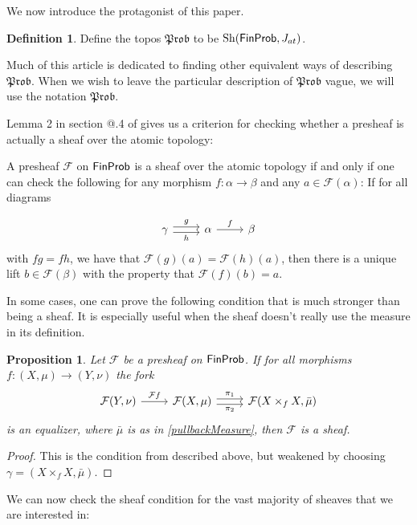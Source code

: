 \documentclass[a4paper]{amsproc}
\makeatletter
\theoremstyle{plain}
\newtheorem{proposition}[theorem]{Proposition}
\theoremstyle{definition}
\newtheorem{definition}[theorem]{Definition}
\theoremstyle{remark}
\numberwithin{equation}{section}
\DeclareMathOperator{\Sh}{Sh}
\newcommand{\FinProb}{\textup{\textsf{FinProb}}}
\newcommand{\Prob}{\mathfrak{Prob}}
\newcommand{\Rmnum}[1]{\expandafter\@slowromancap\romannumeral #1@}
\makeatother
\begin{document}
We now introduce the protagonist of this paper.

\begin{definition}
    Define the topos $\Prob$ to be $\Sh(\FinProb, J_{at})$.
\end{definition}

Much of this article is dedicated to finding other equivalent ways of describing $\Prob$. When we wish to leave the particular description of $\Prob$ vague, we will use the notation $\Prob$.

Lemma 2 in section \Rmnum{3}.4 of \cite{maclane2012sheaves} gives us a criterion for checking whether a presheaf is actually a sheaf over the atomic topology:

A presheaf $\mathcal{F}$ on $\FinProb$ is a sheaf over the atomic topology if and only if one can check the following for any morphism $f: \alpha \to \beta$ and any $a \in \mathcal{F}(\alpha)$: If for all diagrams

\[
\begin{tikzcd}
\gamma \arrow[r, "g", shift left] \arrow[r, "h"', shift right] & \alpha \arrow[r, "f"] & \beta
\end{tikzcd}
\]
with $f g = f h$, we have that $\mathcal{F}(g)(a) = \mathcal{F}(h)(a)$, then there is a unique lift $b \in \mathcal{F}(\beta)$ with the property that $\mathcal{F}(f)(b) = a$.

In some cases, one can prove the following condition that is much stronger than being a sheaf. It is especially useful when the sheaf doesn't really use the measure in its definition.

\begin{proposition} \label{sheafConditionWeak}
Let $\mathcal{F}$ be a presheaf on $\FinProb$. If for all morphisms $f: (X,\mu) \to (Y,\nu)$ the fork
\[
\begin{tikzcd} \mathcal{F} (Y,\nu) \arrow[r, "\mathcal{F}f"] & \mathcal{F} (X,\mu) \arrow[r, "\pi_1", shift left] \arrow[r, "\pi_2"', shift right] & \mathcal{F} (X \times_f X,\bar{\mu})
\end{tikzcd}
\]
is an equalizer, where $\bar{\mu}$ is as in \ref{pullbackMeasure}, then $\mathcal{F}$ is a sheaf.
\end{proposition}
\begin{proof}
This is the condition from \cite{maclane2012sheaves} described above, but weakened by choosing $\gamma = (X \times_f X,\bar{\mu})$.
\end{proof}


We can now check the sheaf condition for the vast majority of sheaves that we are interested in:
\end{document}
